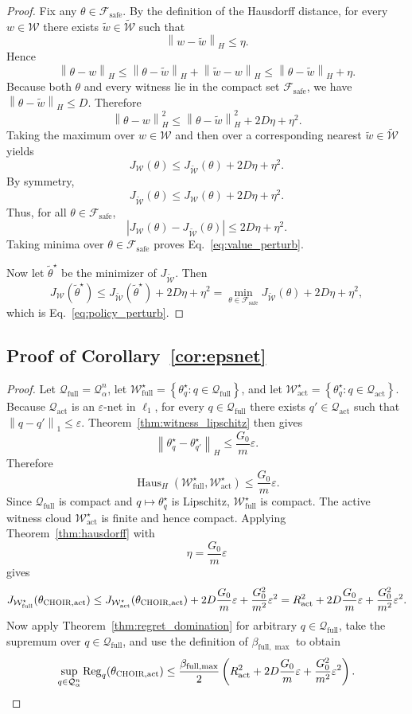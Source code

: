 \documentclass{article}
\newcommand{\cF}{\mathcal{F}}
\newcommand{\cQ}{\mathcal{Q}}
\newcommand{\cW}{\mathcal{W}}
\newcommand{\Reg}{\operatorname{Reg}}
\newcommand{\Haus}{\operatorname{Haus}}
\newcommand{\choir}{\textup{\textsc{CHOIR}}}
\newcommand{\norm}[1]{\left\lVert #1 \right\rVert}
\newcommand{\abs}[1]{\left\lvert #1 \right\rvert}
\newcommand{\paren}[1]{\left( #1 \right)}
\newcommand{\braces}[1]{\left\{ #1 \right\}}
\newcommand{\safe}{\mathrm{safe}}
\newcommand{\act}{\mathrm{act}}
\newcommand{\full}{\mathrm{full}}
\begin{document}
\begin{proof}
Fix any \(\theta\in\cF_{\safe}\). By the definition of the Hausdorff distance, for every \(w\in\cW\) there exists \(\widetilde w\in\widetilde{\cW}\) such that
\[
\norm{w-\widetilde w}_H \le \eta.
\]
Hence
\[
\norm{\theta-w}_H
\le
\norm{\theta-\widetilde w}_H + \norm{\widetilde w-w}_H
\le
\norm{\theta-\widetilde w}_H + \eta.
\]
Because both \(\theta\) and every witness lie in the compact set \(\cF_{\safe}\), we have \(\norm{\theta-\widetilde w}_H \le D\). Therefore
\[
\norm{\theta-w}_H^2
\le
\norm{\theta-\widetilde w}_H^2 + 2D\eta + \eta^2.
\]
Taking the maximum over \(w\in\cW\) and then over a corresponding nearest \(\widetilde w\in\widetilde{\cW}\) yields
\[
J_{\cW}(\theta)
\le
J_{\widetilde{\cW}}(\theta) + 2D\eta + \eta^2.
\]
By symmetry,
\[
J_{\widetilde{\cW}}(\theta)
\le
J_{\cW}(\theta) + 2D\eta + \eta^2.
\]
Thus, for all \(\theta\in\cF_{\safe}\),
\[
\abs{J_{\cW}(\theta)-J_{\widetilde{\cW}}(\theta)}
\le
2D\eta + \eta^2.
\]
Taking minima over \(\theta\in\cF_{\safe}\) proves Eq.~\eqref{eq:value_perturb}.

Now let \(\widetilde\theta^\star\) be the minimizer of \(J_{\widetilde{\cW}}\). Then
\[
J_{\cW}(\widetilde\theta^\star)
\le
J_{\widetilde{\cW}}(\widetilde\theta^\star) + 2D\eta + \eta^2
=
\min_{\theta\in\cF_{\safe}} J_{\widetilde{\cW}}(\theta) + 2D\eta + \eta^2,
\]
which is Eq.~\eqref{eq:policy_perturb}.
\end{proof}

\subsection{Proof of Corollary~\ref{cor:epsnet}}

\begin{proof}
Let \(\cQ_{\full}=\cQ_\alpha^n\), let \(\cW_{\full}^\star = \braces{\theta_q^\star:q\in\cQ_{\full}}\), and let \(\cW_{\act}^\star = \braces{\theta_q^\star:q\in\cQ_{\act}}\). Because \(\cQ_{\act}\) is an \(\varepsilon\)-net in \(\ell_1\), for every \(q\in\cQ_{\full}\) there exists \(q'\in\cQ_{\act}\) such that \(\norm{q-q'}_1\le \varepsilon\). Theorem~\ref{thm:witness_lipschitz} then gives
\[
\norm{\theta_q^\star-\theta_{q'}^\star}_H
\le
\frac{G_0}{m}\varepsilon.
\]
Therefore
\[
\Haus_H(\cW_{\full}^\star,\cW_{\act}^\star)
\le
\frac{G_0}{m}\varepsilon.
\]
Since \(\cQ_{\full}\) is compact and \(q\mapsto\theta_q^\star\) is Lipschitz, \(\cW_{\full}^\star\) is compact. The active witness cloud \(\cW_{\act}^\star\) is finite and hence compact. Applying Theorem~\ref{thm:hausdorff} with
\[
\eta = \frac{G_0}{m}\varepsilon
\]
gives
\[
J_{\cW_{\full}^\star}(\theta_{\choir,\act})
\le
J_{\cW_{\act}^\star}(\theta_{\choir,\act}) + 2D\frac{G_0}{m}\varepsilon + \frac{G_0^2}{m^2}\varepsilon^2
=
R_\act^2 + 2D\frac{G_0}{m}\varepsilon + \frac{G_0^2}{m^2}\varepsilon^2.
\]
Now apply Theorem~\ref{thm:regret_domination} for arbitrary \(q\in\cQ_{\full}\), take the supremum over \(q\in\cQ_{\full}\), and use the definition of \(\beta_{\full,\max}\) to obtain
\[
\sup_{q\in\cQ_\alpha^n} \Reg_q(\theta_{\choir,\act})
\le
\frac{\beta_{\full,\max}}{2}
\paren{
R_\act^2 + 2D\frac{G_0}{m}\varepsilon + \frac{G_0^2}{m^2}\varepsilon^2
}.
\]
\end{proof}
\end{document}

